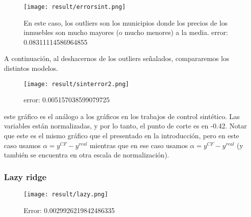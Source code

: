 \documentclass[12pt]{article}
\begin{document}
\begin{figure}[H]
\centering
\texttt{[image: result/errorsint.png]}
\caption{En este caso, los outliers son los municipios donde los precios de los inmuebles son mucho mayores (o mucho menores) a la media. error: 0.08311114586964855}
\end{figure}

A continuación, al deshacernos de los outliers señalados, compararemos los distintos modelos.

\begin{figure}[H]
\centering
\texttt{[image: result/sinterror2.png]}
\caption*{error: 0.005157038599079725}
\end{figure}

este gráfico es el análogo a los gráficos en los trabajos de control sintético. Las variables están normalizadas, y por lo tanto, el punto de corte es en -0.42. Notar que este es el mismo gráfico que el presentado en la introducción, pero en este caso usamos {$ \alpha =y^{CF}-y^{real} $} mientras que en ese caso usamos {$ \alpha =y^{CF}-y^{real} $} (y también se encuentra en otra escala de normalización).

\subsubsection{Lazy ridge}

\begin{figure}[H]
\centering
\texttt{[image: result/lazy.png]}
\caption*{Error: 0.0029926219842486335}
\end{figure}
\end{document}

